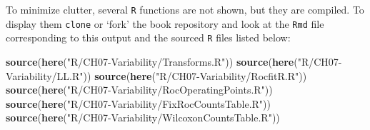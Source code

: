 \documentclass[
]{book}
\newenvironment{Shaded}{\begin{snugshade}}{\end{snugshade}}
\newcommand{\KeywordTok}[1]{\textcolor[rgb]{0.13,0.29,0.53}{\textbf{#1}}}
\newcommand{\NormalTok}[1]{#1}
\newcommand{\StringTok}[1]{\textcolor[rgb]{0.31,0.60,0.02}{#1}}
\begin{document}
To minimize clutter, several \texttt{R} functions are not shown, but they are compiled. To display them \texttt{clone} or `fork' the book repository and look at the \texttt{Rmd} file corresponding to this output and the sourced \texttt{R} files listed below:

\begin{Shaded}
\begin{Highlighting}[]
\KeywordTok{source}\NormalTok{(}\KeywordTok{here}\NormalTok{(}\StringTok{"R/CH07-Variability/Transforms.R"}\NormalTok{))}
\KeywordTok{source}\NormalTok{(}\KeywordTok{here}\NormalTok{(}\StringTok{"R/CH07-Variability/LL.R"}\NormalTok{))}
\KeywordTok{source}\NormalTok{(}\KeywordTok{here}\NormalTok{(}\StringTok{"R/CH07-Variability/RocfitR.R"}\NormalTok{)) }
\KeywordTok{source}\NormalTok{(}\KeywordTok{here}\NormalTok{(}\StringTok{"R/CH07-Variability/RocOperatingPoints.R"}\NormalTok{))}
\KeywordTok{source}\NormalTok{(}\KeywordTok{here}\NormalTok{(}\StringTok{"R/CH07-Variability/FixRocCountsTable.R"}\NormalTok{))}
\KeywordTok{source}\NormalTok{(}\KeywordTok{here}\NormalTok{(}\StringTok{"R/CH07-Variability/WilcoxonCountsTable.R"}\NormalTok{))}
\end{Highlighting}
\end{Shaded}
\end{document}

